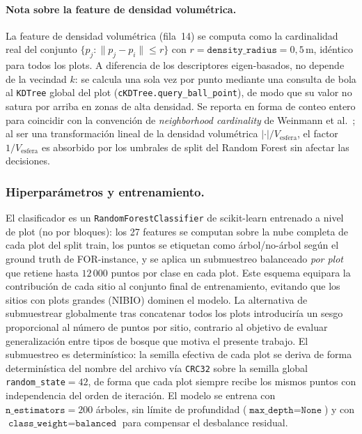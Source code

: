 \documentclass[runningheads]{llncs}
\begin{document}
\paragraph{Nota sobre la feature de densidad volum\'etrica.}
La feature de densidad volum\'etrica (fila~14) se computa como la cardinalidad real del conjunto $\{p_j : \lVert p_j - p_i \rVert \leq r\}$ con $r = \texttt{density\_radius} = 0{,}5$\,m, id\'entico para todos los plots. A diferencia de los descriptores eigen-basados, no depende de la vecindad $k$: se calcula una sola vez por punto mediante una consulta de bola al \texttt{KDTree} global del plot (\texttt{cKDTree.query\_ball\_point}), de modo que su valor no satura por arriba en zonas de alta densidad. Se reporta en forma de conteo entero para coincidir con la convenci\'on de \emph{neighborhood cardinality} de Weinmann et al.~\cite{weinmann2015}; al ser una transformaci\'on lineal de la densidad volum\'etrica $|\cdot|/V_{\text{esfera}}$, el factor $1/V_{\text{esfera}}$ es absorbido por los umbrales de split del Random Forest sin afectar las decisiones.

\subsubsection{Hiperpar\'ametros y entrenamiento.}
El clasificador es un \texttt{RandomForestClassifier} de scikit-learn entrenado a nivel de plot (no por bloques): los 27 features se computan sobre la nube completa de cada plot del split train, los puntos se etiquetan como \'arbol/no-\'arbol seg\'un el ground truth de FOR-instance, y se aplica un submuestreo balanceado \emph{por plot} que retiene hasta $12\,000$ puntos por clase en cada plot. Este esquema equipara la contribuci\'on de cada sitio al conjunto final de entrenamiento, evitando que los sitios con plots grandes (NIBIO) dominen el modelo. La alternativa de submuestrear globalmente tras concatenar todos los plots introducir\'ia un sesgo proporcional al n\'umero de puntos por sitio, contrario al objetivo de evaluar generalizaci\'on entre tipos de bosque que motiva el presente trabajo. El submuestreo es determin\'istico: la semilla efectiva de cada plot se deriva de forma determin\'istica del nombre del archivo v\'ia \texttt{CRC32} sobre la semilla global \texttt{random\_state}$=42$, de forma que cada plot siempre recibe los mismos puntos con independencia del orden de iteraci\'on. El modelo se entrena con $\texttt{n\_estimators}=200$ \'arboles, sin l\'imite de profundidad ($\texttt{max\_depth}=\texttt{None}$) y con $\texttt{class\_weight}=\texttt{balanced}$ para compensar el desbalance residual.
\end{document}
